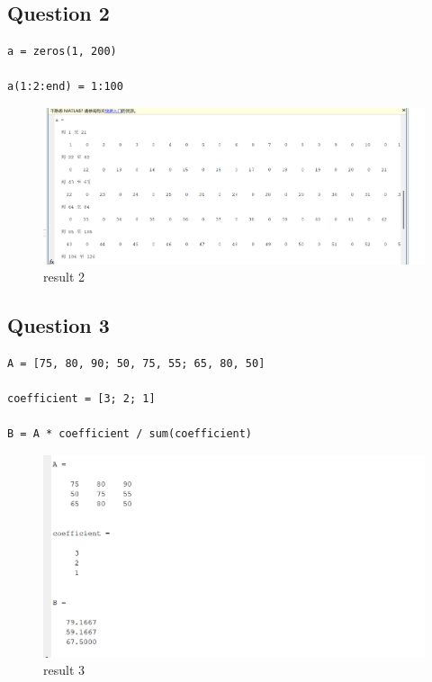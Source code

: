 \documentclass{article}
\begin{document}
\subsection{Question 2}
\begin{lstlisting}
a = zeros(1, 200)

a(1:2:end) = 1:100
\end{lstlisting}
\begin{figure}[H]
    \centering
    \includegraphics[width=1\linewidth]{2.png}
    \caption{result 2}
    \label{fig:2}
\end{figure}

\subsection{Question 3}
\begin{lstlisting}
A = [75, 80, 90; 50, 75, 55; 65, 80, 50]

coefficient = [3; 2; 1]

B = A * coefficient / sum(coefficient)
\end{lstlisting}
\begin{figure}[H]
    \centering
    \includegraphics[width=1\linewidth]{3.png}
    \caption{result 3}
    \label{fig:3}
\end{figure}
\end{document}
